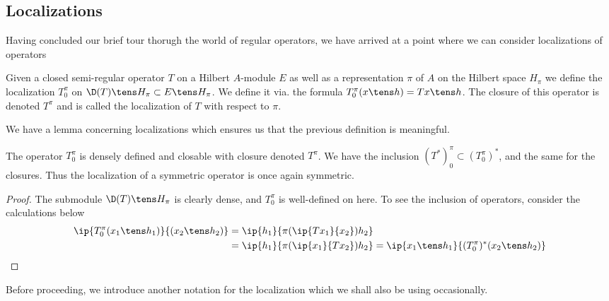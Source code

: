 \subsection{Localizations}
Having concluded our brief tour thorugh the world of regular operators, we have arrived at a point where we can consider localizations of operators
\begin{definition}
	Given a closed semi-regular operator $T$ on a Hilbert $A$-module $E$ as well as a representation $\pi$ of $A$ on the Hilbert space $H_\pi$ we define the localization $T_0^\pi$ on $\D(T)\tens H_\pi\subset E\tens H_\pi$. We define it via. the formula $T_0^\pi(x\tens h)=Tx\tens h$. The closure of this operator is denoted $T^\pi$ and is called the localization of $T$ with respect to $\pi$.
\end{definition}
We have a lemma concerning localizations which ensures us that the previous definition is meaningful. 
\begin{lemma}
	The operator $T_0^\pi$ is densely defined and closable with closure denoted $T^\pi$. We have the inclusion $(T^*)_0^\pi\subset (T_0^\pi)^*$, and the same for the closures. Thus the localization of a symmetric operator is once again symmetric. 
\end{lemma}
\begin{proof}
	The submodule $\D(T)\tens H_{\pi}$ is clearly dense, and $T_0^\pi$ is well-defined on here. To see the inclusion of operators, consider the calculations below
	\begin{align*}
		\ip{T_0^\pi(x_1\tens h_1)}{(x_2\tens h_2)}&=\ip{h_1}{\pi(\ip{Tx_1}{x_2})h_2} \\
		&=\ip{h_1}{\pi(\ip{x_1}{Tx_2})h_2}=\ip{x_1\tens h_1}{(T_0^\pi)^*(x_2\tens h_2)}
	\end{align*}
\end{proof}
Before proceeding, we introduce another notation for the localization which we shall also be using occasionally.

